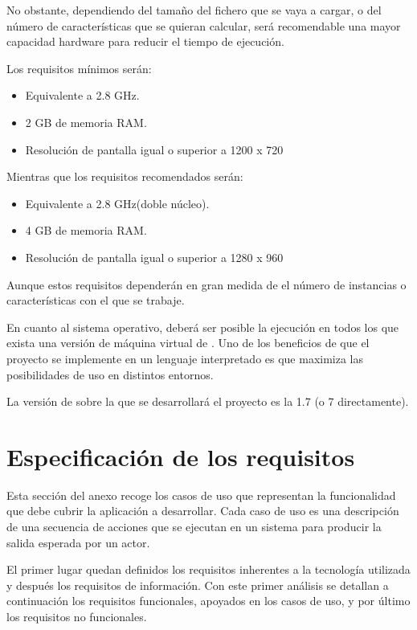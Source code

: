 No obstante, dependiendo del tamaño del fichero \arff{} que se vaya a cargar, o del número de características que se quieran calcular, será recomendable una mayor capacidad hardware para reducir el tiempo de ejecución.

Los requisitos mínimos serán:
\begin{itemize}
 \item Equivalente a 2.8 GHz.
 \item 2 GB de memoria RAM.
 \item Resolución de pantalla igual o superior a 1200 x 720
\end{itemize}

Mientras que los requisitos recomendados serán:
\begin{itemize}
 \item Equivalente a 2.8 GHz(doble núcleo).
 \item 4 GB de memoria RAM.
 \item Resolución de pantalla igual o superior a 1280 x 960
\end{itemize}

Aunque estos requisitos dependerán en gran medida de el número de instancias o características con el que se trabaje.

En cuanto al sistema operativo, deberá ser posible la ejecución en todos los que exista una versión de máquina virtual de \java{}. Uno de los beneficios de que el proyecto se implemente en un lenguaje interpretado es que maximiza las posibilidades de uso en distintos entornos.

La versión de \java{} sobre la que se desarrollará el proyecto es la 1.7 (o 7 directamente).
\newpage



\section{Especificación de los requisitos}
Esta sección del anexo recoge los casos de uso que representan la funcionalidad que debe cubrir la aplicación a desarrollar. Cada caso de uso es una descripción de una secuencia de acciones que se ejecutan en un sistema para producir la salida esperada por un actor.

El primer lugar quedan definidos los requisitos inherentes a la tecnología utilizada y después los requisitos de información. Con este primer análisis se detallan a continuación los requisitos funcionales, apoyados en los casos de uso, y por último los requisitos no funcionales.


